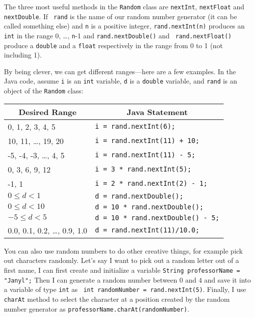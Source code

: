 The three most useful methods in the {\tt Random} class are {\tt nextInt}, {\tt nextFloat} and {\tt nextDouble}. If {\tt
rand} is the name of our random number generator (it can be called something else) and {\tt n} is a positive integer,
{\tt rand.nextInt(n)} produces an {\tt int} in the range 0, \ldots, {\tt n}-1 and {\tt rand.nextDouble()} and {\tt
rand.nextFloat()} produce a {\tt double} and a {\tt float} respectively in the range from 0 to 1 (not including 1).

By being clever, we can get different ranges---here are a few examples. In the Java code, assume {\tt i} is an {\tt int}
variable, {\tt d} is a {\tt double} variable, and {\tt rand} is an object of the {\tt Random} class:

\begin{center}
\begin{tabular}{p{2.5in}p{3.5in}}
\multicolumn{1}{c}{\bf Desired Range} & \multicolumn{1}{c}{\bf Java
Statement}\\\hline
0, 1, 2, 3, 4, 5 & \verb$i = rand.nextInt(6);$\\
10, 11, \ldots, 19, 20 & \verb$i = rand.nextInt(11) + 10;$\\
-5, -4, -3, \ldots, 4, 5 & \verb$i = rand.nextInt(11) - 5;$\\
0, 3, 6, 9, 12 & \verb$i = 3 * rand.nextInt(5);$\\
-1, 1 & \verb$i = 2 * rand.nextInt(2) - 1;$\\
$0 \leq d < 1$ & \verb$d = rand.nextDouble();$\\
$0 \leq d < 10$ & \verb$d = 10 * rand.nextDouble();$\\
$-5 \leq d < 5$ & \verb$d = 10 * rand.nextDouble() - 5;$\\
0.0, 0.1, 0.2, \ldots, 0.9, 1.0 & \verb$d = rand.nextInt(11)/10.0;$
\end{tabular}
\end{center}

You can also use random numbers to do other creative things, for example pick out characters randomly. Let's say I want
to pick out a random letter out of a first name, I can first create and initialize a variable {\tt{String professorName =
"Janyl";}} Then I can generate a random number between $0$ and $4$ and save it into a variable of type {\tt int} as
{\tt{ int randomNumber = rand.nextInt(5)}}. Finally, I  use {\tt{charAt}} method to select the character at a position
created by the random number generator as {\tt{professorName.charAt(randomNumber)}}.


